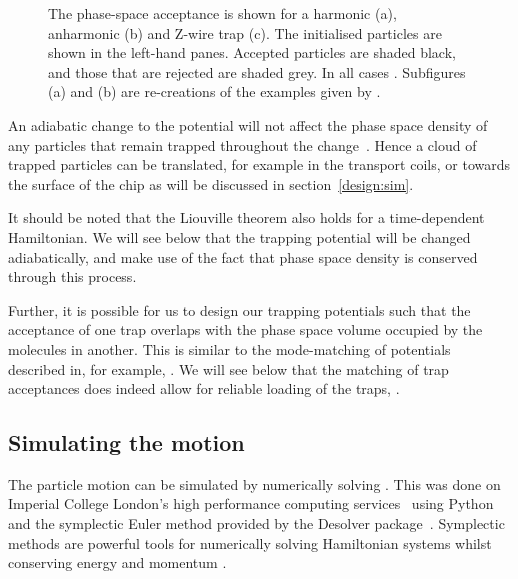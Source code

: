 \begin{figure}
  \centering
  \caption{
    The phase-space acceptance is shown for a harmonic (a), anharmonic (b) and
    Z-wire trap (c). The initialised particles are shown in the left-hand
    panes. Accepted particles are shaded black, and those that are rejected are
    shaded grey. In all cases . Subfigures (a) and (b)
    are re-creations of the examples given by .
  }
  \label{design:fig:psaeg}
\end{figure}

An adiabatic change to the potential will not affect the phase space density of
any particles that remain trapped throughout the change~\cite{Hand1998,
Lichtenberg1969}. Hence a cloud of trapped particles can be translated, for
example in the transport coils, or towards the surface of the chip as will be
discussed in section~\ref{design:sim}.

It should be noted that the Liouville theorem also holds for a time-dependent
Hamiltonian. We will see below that the trapping potential will be changed
adiabatically, and make use of the fact that phase space density is conserved
through this process.

Further, it is possible for us to design our trapping potentials such that the
acceptance of one trap overlaps with the phase space volume occupied by the
molecules in another. This is similar to
the mode-matching of
potentials described in, for example, . We will see below
that the matching of trap acceptances does indeed allow for reliable loading of
the traps, .

\subsection{Simulating the motion}
\label{design:motion:simmethods}


The particle motion can be simulated by numerically solving
. This was done on Imperial College London's high
performance computing services~\cite{ICRCS} using Python~\cite{python} and the
symplectic Euler method provided by the Desolver package~\cite{desolver}.
Symplectic methods are powerful tools for numerically solving Hamiltonian
systems whilst conserving energy and momentum \cite{Hairer2015,
doi:10.1119/1.2034523}. 

